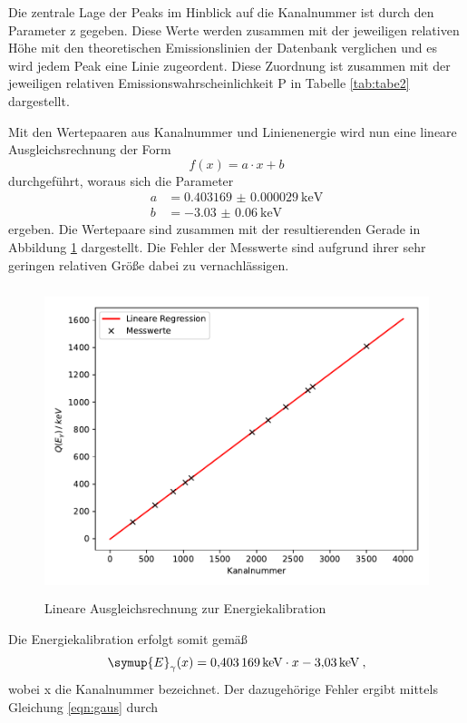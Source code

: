 Die zentrale Lage der Peaks im Hinblick auf die Kanalnummer ist durch den Parameter
z gegeben. Diese Werte werden zusammen mit der jeweiligen relativen Höhe mit den theoretischen
Emissionslinien der Datenbank \cite{lara} verglichen und es wird jedem Peak eine Linie
zugeordent. Diese Zuordnung ist zusammen mit der jeweiligen relativen Emissionswahrscheinlichkeit P
in Tabelle \ref{tab:tabe2} dargestellt.

Mit den Wertepaaren aus Kanalnummer und Linienenergie wird nun eine lineare Ausgleichsrechnung der
Form
\begin{equation}
  f(x) = a\cdot x +b
  \label{eqn:li}
\end{equation}
durchgeführt, woraus sich die Parameter
\begin{align}
  a &= \SI{0.403169(29)}{\kilo\electronvolt} \\
  b &= \SI{-3.03(6)}{\kilo\electronvolt}
\end{align}
ergeben. Die Wertepaare sind zusammen mit der resultierenden Gerade in Abbildung \ref{fig:plot3}
dargestellt. Die Fehler der Messwerte sind aufgrund ihrer sehr geringen relativen Größe dabei zu vernachlässigen.
\begin{figure}
  \centering
  \includegraphics[height=9cm]{plot3.pdf}
  \caption{Lineare Ausgleichsrechnung zur Energiekalibration}
  \label{fig:plot3}
\end{figure}
Die Energiekalibration erfolgt somit gemäß
\begin{equation}
  \symup{E}_{\gamma} (x) = \SI{0.403169}{\kilo\electronvolt}\cdot x - \SI{3.03}{\kilo\electronvolt} \: ,
  \label{eqn:gerade}
\end{equation}
wobei x die Kanalnummer bezeichnet.
Der dazugehörige Fehler ergibt mittels Gleichung \ref{eqn:gaus} durch
